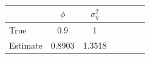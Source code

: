 \begin{tabular}{lcccccc}
\toprule
& $\phi$ & $\sigma_\eta^2$ \\
\midrule
True & 0.9 &  1 \\
Estimate & 0.8903 & 1.3518 \\
\bottomrule
\end{tabular}

